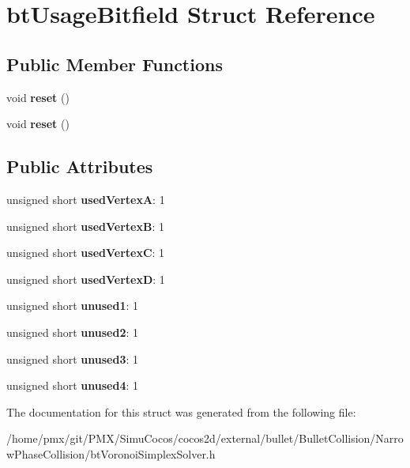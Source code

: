 \hypertarget{structbtUsageBitfield}{}\section{bt\+Usage\+Bitfield Struct Reference}
\label{structbtUsageBitfield}
\subsection*{Public Member Functions}
\begin{DoxyCompactItemize}
\item 
\mbox{\label{structbtUsageBitfield_a887b34752e6e1a0e6af5e80ba0474a42}} 
void {\bfseries reset} ()
\item 
\mbox{\label{structbtUsageBitfield_a887b34752e6e1a0e6af5e80ba0474a42}} 
void {\bfseries reset} ()
\end{DoxyCompactItemize}
\subsection*{Public Attributes}
\begin{DoxyCompactItemize}
\item 
\mbox{\label{structbtUsageBitfield_a89f4e3bfb8f8c5d25aed05509b7009f8}} 
unsigned short {\bfseries used\+VertexA}\+: 1
\item 
\mbox{\label{structbtUsageBitfield_a2cb57078f8cc12563e203943d2ff9410}} 
unsigned short {\bfseries used\+VertexB}\+: 1
\item 
\mbox{\label{structbtUsageBitfield_a043b60da708ba0bc2afa2b8fb42c6258}} 
unsigned short {\bfseries used\+VertexC}\+: 1
\item 
\mbox{\label{structbtUsageBitfield_aee95f13a3e9ed4e8dce9e4e10ffb1a41}} 
unsigned short {\bfseries used\+VertexD}\+: 1
\item 
\mbox{\label{structbtUsageBitfield_aadbb6e9c0d36c63655e4737819e70d88}} 
unsigned short {\bfseries unused1}\+: 1
\item 
\mbox{\label{structbtUsageBitfield_ad3b32bf8a67c2292de05a607217177fb}} 
unsigned short {\bfseries unused2}\+: 1
\item 
\mbox{\label{structbtUsageBitfield_ab801bb6d791973098ff4d135fa553726}} 
unsigned short {\bfseries unused3}\+: 1
\item 
\mbox{\label{structbtUsageBitfield_a2fccd8b7050cdd1fd0792eae3cf89878}} 
unsigned short {\bfseries unused4}\+: 1
\end{DoxyCompactItemize}


The documentation for this struct was generated from the following file\+:\begin{DoxyCompactItemize}
\item 
/home/pmx/git/\+P\+M\+X/\+Simu\+Cocos/cocos2d/external/bullet/\+Bullet\+Collision/\+Narrow\+Phase\+Collision/bt\+Voronoi\+Simplex\+Solver.\+h\end{DoxyCompactItemize}
